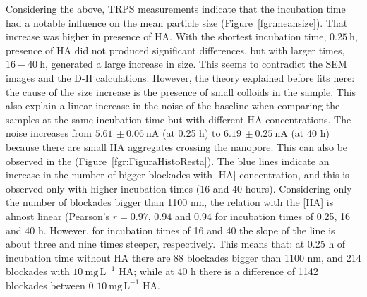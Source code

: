 \documentclass[journal=langd5,manuscript=article]{achemso}
\begin{document}
Considering the above, TRPS measurements indicate that the incubation time had a notable influence on the mean particle size (Figure~\ref{fgr:meansize}). That increase was higher in presence of HA. With the shortest incubation time, $0.25~\mathrm{h}$, presence of HA did not produced significant differences, but with larger times, $16 - 40~\mathrm{h}$, generated a large increase in size. This seems to contradict the SEM images and the D-H calculations. However, the theory explained before fits here: the cause of the size increase is the presence of small colloids in the sample. This also explain a linear increase in the noise of the baseline when comparing the samples at the same incubation time but with different HA concentrations. The noise increases from $5.61\,\pm 0.06~\mathrm{nA}$ (at 0.25 h) to $6.19\,\pm 0.25~\mathrm{nA}$ (at 40 h) because there are small HA aggregates crossing the nanopore. This can also be observed in the (Figure~\ref{fgr:FiguraHistoResta}). The blue lines indicate an increase in the number of bigger blockades with [HA] concentration, and this is observed only with higher incubation times (16 and 40 hours). Considering only the number of blockades bigger than 1100 nm, the relation with the [HA] is almost linear (Pearson's $r =  0.97,\, 0.94$ and $0.94$ for incubation times of 0.25, 16 and 40 h. However, for incubation times of 16 and 40 the slope of the line is about three and nine times steeper, respectively. This means that: at 0.25 h of incubation time without HA there are 88 blockades bigger than 1100 nm, and 214 blockades with 
$10~\mathrm{mg\, L^{-1}}$ HA;
while at 40 h there is a difference of 1142 blockades between 0 
$10~\mathrm{mg\, L^{-1}}$ HA.
\end{document}
